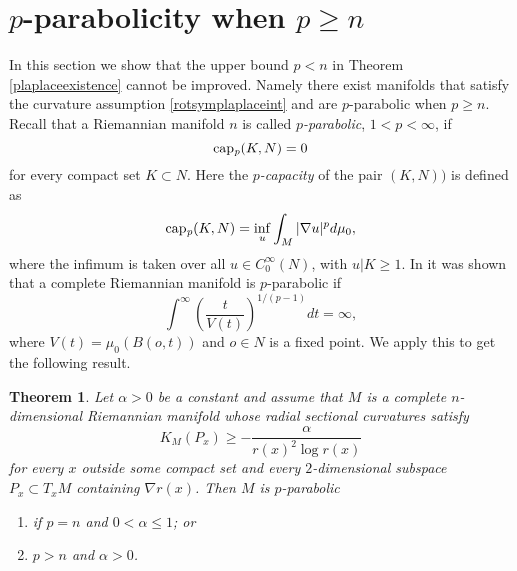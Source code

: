 \documentclass[10pt,a4paper,reqno]{amsart}
\DeclareMathOperator\pcap{cap_\emph{p}}
\numberwithin{equation}{section}
\theoremstyle{plain}
\newtheorem{thm}{Theorem}[section]
\theoremstyle{definition}
\begin{document}
\section{$p$-parabolicity when $p\ge n$}\label{parabol_sec}

In this section we show that the upper bound $p < n$ in Theorem \ref{plaplaceexistence} cannot be
improved. Namely there exist manifolds that satisfy the curvature assumption \eqref{rotsymplaplaceint}
and are $p$-parabolic when $p\ge n$. Recall that a Riemannian manifold $n$ is 
called \emph{$p$-parabolic}, $1<p<\infty$, if
    \[
     \pcap(K,N) = 0
    \]
for every compact set $K\subset N$. Here the \emph{$p$-capacity} of the pair $(K,N))$ is defined as
\[
\pcap(K,N)=\inf_{u}\int_{M}|\nabla u|^p d\mu_0,
\]
where the infimum is taken over all $u\in C^{\infty}_0(N)$, with $u|K\ge 1$.
In \cite[Proposition 1.7]{holDuke} it was shown that a complete Riemannian manifold is $p$-parabolic
if
  \[
   \int^\infty \left( \frac{t}{V(t)} \right)^{1/(p-1)} dt = \infty,
  \]
where $V(t) = \mu_0(B(o,t))$ and $o\in N$ is a fixed point. We apply this to get the following result.
\begin{thm}\label{parabthm}
 Let $\alpha > 0$ be a constant and assume that $M$ is a complete $n$-dimensional Riemannian manifold whose radial sectional curvatures 
 satisfy 
  \begin{equation}\label{paracurv}
    K_M(P_x) \ge - \frac{\alpha}{r(x)^2 \log r(x)}
  \end{equation}
for every $x$ outside some compact set and every $2$-dimensional subspace $P_x\subset T_xM$ containing $\nabla r(x)$. Then
$M$ is $p$-parabolic 
\begin{enumerate}
\item[(a)] if $p=n$ and $0<\alpha\le 1$; or
\item[(b)] $p>n$ and $\alpha>0$.
\end{enumerate}
\end{thm}
\end{document}
